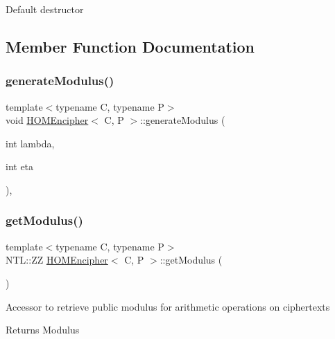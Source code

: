 Default destructor 

\subsection{Member Function Documentation}
\mbox{\label{classHOMEncipher_a6a715a6beed3174acc8d812d570462ca}} 
\subsubsection{\texorpdfstring{generate\+Modulus()}{generateModulus()}}
{\footnotesize\ttfamily template$<$typename C, typename P$>$ \\
void \hyperlink{classHOMEncipher}{H\+O\+M\+Encipher}$<$ C, P $>$\+::generate\+Modulus (\begin{DoxyParamCaption}\item[{int}]{lambda,  }\item[{int}]{eta }\end{DoxyParamCaption})\hspace{0.3cm}{\ttfamily [inline]}, {\ttfamily [protected]}}

\mbox{\label{classHOMEncipher_a43f920fd7feb8f3c9c6532c4935a6922}} 
\subsubsection{\texorpdfstring{get\+Modulus()}{getModulus()}}
{\footnotesize\ttfamily template$<$typename C, typename P$>$ \\
N\+T\+L\+::\+ZZ \hyperlink{classHOMEncipher}{H\+O\+M\+Encipher}$<$ C, P $>$\+::get\+Modulus (\begin{DoxyParamCaption}{ }\end{DoxyParamCaption})\hspace{0.3cm}{\ttfamily [inline]}}

Accessor to retrieve public modulus for arithmetic operations on ciphertexts \begin{DoxyReturn}{Returns}
Modulus 
\end{DoxyReturn}
\mbox{\label{classHOMEncipher_aefdaccfe94ca8bd67a3ed1f5f045b04a}} 
